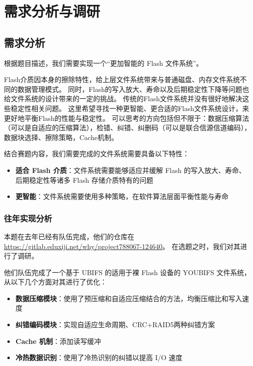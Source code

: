 \section{需求分析与调研}

\subsection{需求分析}

根据题目描述，我们需要实现一个“更加智能的 Flash 文件系统”。

Flash介质因本身的擦除特性，给上层文件系统带来与普通磁盘、内存文件系统不同的数据管理模式。
同时，Flash的写入放大、寿命以及后期稳定性下降等问题也给文件系统的设计带来的一定的挑战。
传统的Flash文件系统并没有很好地解决这些稳定性相关问题。
这里希望寻找一种更智能、更合适的Flash文件系统设计，来更好地平衡Flash的性能与稳定性。
可以思考的方向包括但不限于：数据压缩算法（可以是自适应的压缩算法），检错、纠错、纠删码（可以是联合信源信道编码），数据块选择、擦除策略，Cache机制。

结合赛题内容，我们需要完成的文件系统需要具备以下特性：

\begin{itemize}
  \item {\bf{适合 Flash 介质}}：文件系统需要能够适应并缓解 Flash 的写入放大、寿命、后期稳定性等诸多 Flash 存储介质特有的问题
  \item {\bf{更智能}}：文件系统需要使用多种策略，在软件算法层面平衡性能与寿命
\end{itemize}

\subsubsection{往年实现分析}

本题在去年已经有队伍完成，他们的仓库在 \url{https://gitlab.eduxiji.net/why/project788067-124640}。
在选题之时，我们对其进行了调研。

他们队伍完成了一个基于 UBIFS 的适用于裸 Flash 设备的 YOUBIFS 文件系统，从以下几个方面对其进行了优化：

\begin{itemize}
  \item {\bf{数据压缩模块}}：使用了预压缩和自适应压缩结合的方法，均衡压缩比和写入速度
  \item {\bf{纠错编码模块}}：实现自适应生命周期、CRC+RAID5两种纠错方案
  \item {\bf{Cache 机制}}：添加读写缓冲
  \item {\bf{冷热数据识别}}：使用了冷热识别的纠错以提高 I/O 速度
\end{itemize}

